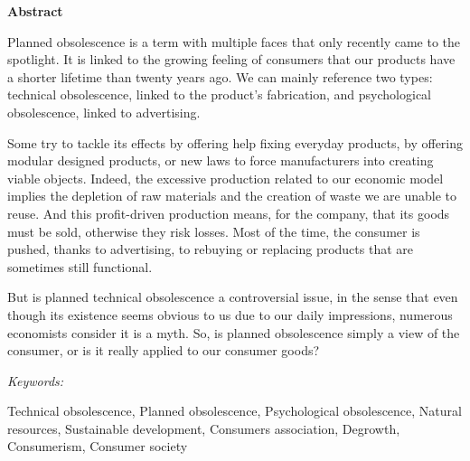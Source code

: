 \vfill


\begin{Large}
\textbf{Abstract}
\end{Large}

\vspace{1\baselineskip}

Planned obsolescence is a term with multiple faces that only recently came to the spotlight. It is linked to the growing feeling of consumers that our products have a shorter lifetime than twenty years ago. We can mainly reference two types: technical obsolescence, linked to the product’s fabrication, and psychological obsolescence, linked to advertising.

Some try to tackle its effects by offering help fixing everyday products, by offering modular designed products, or new laws to force manufacturers into creating viable objects. Indeed, the excessive production related to our economic model implies the depletion of raw materials and the creation of waste we are unable to reuse. And this profit-driven production means, for the company, that its goods must be sold, otherwise they risk losses. Most of the time, the consumer is pushed, thanks to advertising, to rebuying or replacing products that are sometimes still functional.

But is planned technical obsolescence a controversial issue, in the sense that even though its existence seems obvious to us due to our daily impressions, numerous economists consider it is a myth. So, is planned obsolescence simply a view of the consumer, or is it really applied to our consumer goods?
\vspace{2\baselineskip}

\begin{large}\emph{Keywords:} \end{large} Technical obsolescence, Planned obsolescence, Psychological obsolescence, Natural resources, Sustainable development, Consumers association, Degrowth, Consumerism, Consumer society
